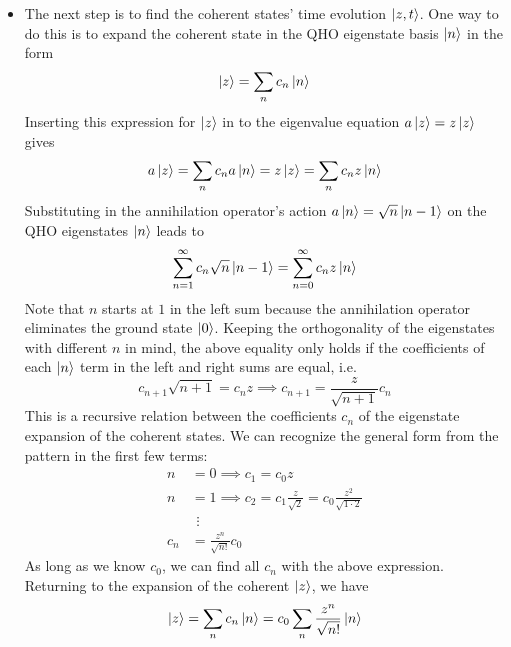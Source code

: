 \documentclass[11pt, a4paper]{article}
\begin{document}
\begin{itemize}
	\item The next step is to find the coherent states' time evolution $ \ket{z, t} $. One way to do this is to expand the coherent state in the QHO eigenstate basis $ \ket{n} $ in the form
	\begin{equation*}
		\ket{z} = \sum_{n} c_{n} \ket{n}
	\end{equation*}
	Inserting this expression for $ \ket{z} $ in to the eigenvalue equation $ a \ket{z} = z \ket{z} $ gives
	\begin{equation*}
		a \ket{z} = \sum_{n} c_{n} a \ket{n} = z \ket{z} = \sum_{n} c_{n} z \ket{n}
	\end{equation*}
	Substituting in the annihilation operator's action  $ a \ket{n} = \sqrt{n}\ket{n-1} $ on the QHO eigenstates $ \ket{n} $ leads to
	\begin{equation*}
		 \sum_{n=1}^{\infty} c_{n} \sqrt{n} \ket{n - 1} =  \sum_{n=0}^{\infty} c_{n} z \ket{n}
	\end{equation*}
	Note that $ n $ starts at $ 1 $ in the left sum because the annihilation operator eliminates the ground state $ \ket{0} $. Keeping the orthogonality of the eigenstates with different $ n $ in mind, the above equality only holds if the coefficients of each $ \ket{n} $ term in the left and right sums are equal, i.e.
	\begin{equation*}
		c_{n+1} \sqrt{n+1} = c_{n}z \implies c_{n+1} = \frac{z}{\sqrt{n+1}}c_{n}
	\end{equation*}
	This is a recursive relation between the coefficients $ c_{n} $ of the eigenstate expansion of the coherent states. We can recognize the general form from the pattern in the first few terms:
	\begin{align*}
		n &= 0 \implies c_{1} = c_{0}z\\
		n &= 1 \implies c_{2} = c_{1}\frac{z}{\sqrt{2}} = c_{0}\frac{z^{2}}{\sqrt{1 \cdot 2}}\\[-4mm]
		&{}\ \, \vdots\\[-4mm]
		c_{n} &= \frac{z^{n}}{\sqrt{n!}}c_{0}
	\end{align*}
	As long as we know $ c_{0} $, we can find all $ c_{n} $ with the above expression. Returning to the expansion of the coherent $ \ket{z} $, we have
	\begin{equation*}
		\ket{z} = \sum_{n}c_{n} \ket{n} = c_{0} \sum_{n} \frac{z^{n}}{\sqrt{n!}}\ket{n}
	\end{equation*}
	

\end{itemize}
\end{document}

